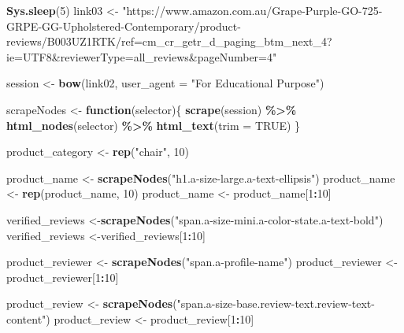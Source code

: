 \documentclass[
]{article}
\newenvironment{Shaded}{\begin{snugshade}}{\end{snugshade}}
\newcommand{\AttributeTok}[1]{\textcolor[rgb]{0.13,0.29,0.53}{#1}}
\newcommand{\ConstantTok}[1]{\textcolor[rgb]{0.56,0.35,0.01}{#1}}
\newcommand{\ControlFlowTok}[1]{\textcolor[rgb]{0.13,0.29,0.53}{\textbf{#1}}}
\newcommand{\DecValTok}[1]{\textcolor[rgb]{0.00,0.00,0.81}{#1}}
\newcommand{\FunctionTok}[1]{\textcolor[rgb]{0.13,0.29,0.53}{\textbf{#1}}}
\newcommand{\NormalTok}[1]{#1}
\newcommand{\OtherTok}[1]{\textcolor[rgb]{0.56,0.35,0.01}{#1}}
\newcommand{\SpecialCharTok}[1]{\textcolor[rgb]{0.81,0.36,0.00}{\textbf{#1}}}
\newcommand{\StringTok}[1]{\textcolor[rgb]{0.31,0.60,0.02}{#1}}
\begin{document}
\begin{Shaded}
\begin{Highlighting}[]
   \FunctionTok{Sys.sleep}\NormalTok{(}\DecValTok{5}\NormalTok{)}
\NormalTok{link03 }\OtherTok{\textless{}{-}} \StringTok{"https://www.amazon.com.au/Grape{-}Purple{-}GO{-}725{-}GRPE{-}GG{-}Upholstered{-}Contemporary/product{-}reviews/B003UZ1RTK/ref=cm\_cr\_getr\_d\_paging\_btm\_next\_4?ie=UTF8\&reviewerType=all\_reviews\&pageNumber=4"}


\NormalTok{  session }\OtherTok{\textless{}{-}} \FunctionTok{bow}\NormalTok{(link02,}
               \AttributeTok{user\_agent =} \StringTok{"For Educational Purpose"}\NormalTok{)}

\NormalTok{  scrapeNodes }\OtherTok{\textless{}{-}} \ControlFlowTok{function}\NormalTok{(selector)\{}
    \FunctionTok{scrape}\NormalTok{(session) }\SpecialCharTok{\%\textgreater{}\%}
      \FunctionTok{html\_nodes}\NormalTok{(selector) }\SpecialCharTok{\%\textgreater{}\%}
      \FunctionTok{html\_text}\NormalTok{(}\AttributeTok{trim =} \ConstantTok{TRUE}\NormalTok{)}
\NormalTok{  \}}

\NormalTok{  product\_category }\OtherTok{\textless{}{-}} \FunctionTok{rep}\NormalTok{(}\StringTok{"chair"}\NormalTok{, }\DecValTok{10}\NormalTok{)}

\NormalTok{  product\_name }\OtherTok{\textless{}{-}} \FunctionTok{scrapeNodes}\NormalTok{(}\StringTok{"h1.a{-}size{-}large.a{-}text{-}ellipsis"}\NormalTok{)}
\NormalTok{  product\_name }\OtherTok{\textless{}{-}} \FunctionTok{rep}\NormalTok{(product\_name, }\DecValTok{10}\NormalTok{)}
\NormalTok{  product\_name }\OtherTok{\textless{}{-}}\NormalTok{ product\_name[}\DecValTok{1}\SpecialCharTok{:}\DecValTok{10}\NormalTok{]}
  
\NormalTok{  verified\_reviews }\OtherTok{\textless{}{-}}\FunctionTok{scrapeNodes}\NormalTok{(}\StringTok{"span.a{-}size{-}mini.a{-}color{-}state.a{-}text{-}bold"}\NormalTok{)}
\NormalTok{  verified\_reviews }\OtherTok{\textless{}{-}}\NormalTok{verified\_reviews[}\DecValTok{1}\SpecialCharTok{:}\DecValTok{10}\NormalTok{]}
  
\NormalTok{  product\_reviewer }\OtherTok{\textless{}{-}} \FunctionTok{scrapeNodes}\NormalTok{(}\StringTok{"span.a{-}profile{-}name"}\NormalTok{)}
\NormalTok{  product\_reviewer }\OtherTok{\textless{}{-}}\NormalTok{ product\_reviewer[}\DecValTok{1}\SpecialCharTok{:}\DecValTok{10}\NormalTok{]}
  
\NormalTok{  product\_review }\OtherTok{\textless{}{-}} \FunctionTok{scrapeNodes}\NormalTok{(}\StringTok{"span.a{-}size{-}base.review{-}text.review{-}text{-}content"}\NormalTok{)}
\NormalTok{  product\_review }\OtherTok{\textless{}{-}}\NormalTok{ product\_review[}\DecValTok{1}\SpecialCharTok{:}\DecValTok{10}\NormalTok{]}
  

\end{Highlighting}
\end{Shaded}
\end{document}

